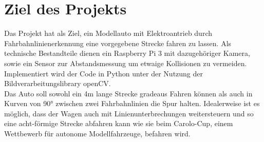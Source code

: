 \section{Ziel des Projekts}
Das Projekt hat als Ziel, ein Modellauto mit Elektroantrieb 
durch Fahrbahnlinienerkennung eine vorgegebene Strecke fahren zu lassen. Als
technische Bestandteile dienen ein Raspberry Pi 3 mit dazugehöriger Kamera, sowie ein Sensor zur Abstandsmessung um etwaige Kollisionen zu
vermeiden. Implementiert wird der Code in Python unter der Nutzung der
Bildverarbeitungslibrary openCV. \\
Das Auto soll  sowohl ein 4m lange Strecke gradeaus Fahren können als auch in Kurven von 90° zwischen zwei Fahrbahnlinien die Spur halten. Idealerweise ist es möglich, dass der Wagen auch mit Linienunterbrechungen weitersteuern und so eine acht-förmige Strecke abfahren kann wie sie beim Carolo-Cup, einem Wettbewerb für autonome Modellfahrzeuge, befahren wird.
